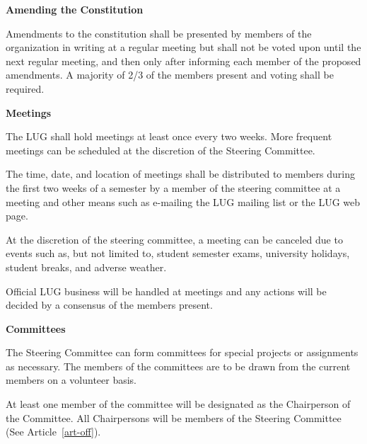 \bigskip
\begin{art} {\bf Amending the Constitution}
\label{art-amemd}

\begin{sect}
Amendments to the constitution shall be presented by members of the
organization in writing at a regular meeting but shall not be voted
upon until the next regular meeting, and then only after informing
each member of the proposed amendments.  A majority of 2/3 of the
members present and voting shall be required.
\end{sect}

\end{art}

\bigskip
\bigskip
\begin{art} {\bf Meetings}
\label{art-meet}

\begin{sect}
The LUG shall hold meetings at least once every two weeks.
More frequent meetings can be scheduled at the discretion of the 
Steering Committee.
\end{sect}
\begin{sect}
The time, date, and location of meetings shall be distributed to
members during the first two weeks of a semester by a member of the
steering committee at a meeting and other means such as e-mailing the LUG
mailing list or the LUG web page.
\end{sect}
\begin{sect}
At the discretion of the steering committee, a meeting can be canceled
due to events such as, but not limited to, student semester exams, university
holidays, student breaks, and adverse weather.
\end{sect}
\begin{sect}
Official LUG business will be handled at meetings and any actions will be
decided by a consensus of the members present.
\end{sect}

\end{art}

\bigskip
\begin{art} {\bf Committees}
\label{art-coms}

\begin{sect}
The Steering Committee can form committees for special projects or
assignments as necessary. The members of the committees are to be drawn
from the current members on a volunteer basis.
\end{sect}

\begin{sect}
At least one member of the committee will be designated as the Chairperson of
the Committee.  All Chairpersons will be members of the Steering Committee
(See Article~\ref{art-off}).
\end{sect}

\end{art}

\vfil


